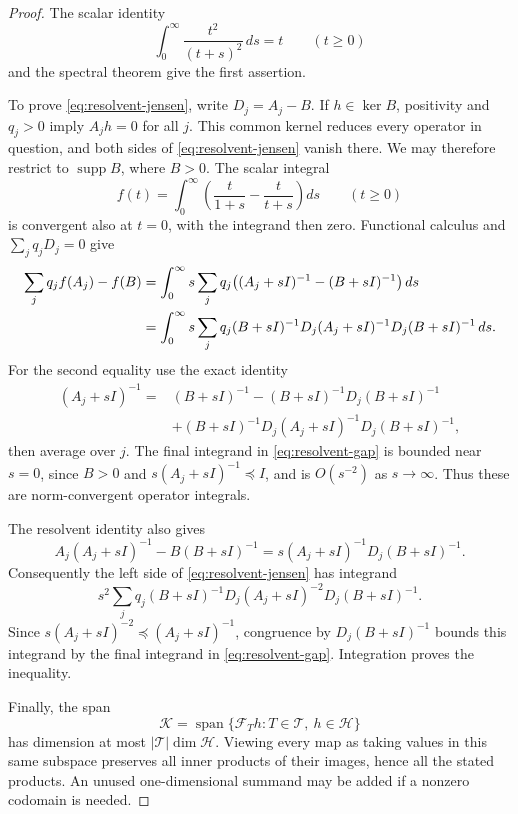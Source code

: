 \begin{proof}
The scalar identity
\[
 \int_0^\infty\frac{t^2}{(t+s)^2}\,ds=t\qquad(t\ge0)
\]
and the spectral theorem give the first assertion.

To prove \eqref{eq:resolvent-jensen}, write $D_j=A_j-B$.
If $h\in\ker B$, positivity and $q_j>0$ imply $A_jh=0$ for
all $j$.  This common kernel reduces every operator in question,
and both sides of \eqref{eq:resolvent-jensen} vanish there.
We may therefore restrict to $\operatorname{supp}B$, where $B>0$.
The scalar integral
\[
 f(t)=\int_0^\infty
       \left(\frac{t}{1+s}-\frac{t}{t+s}\right)ds
 \qquad(t\ge0)
\]
is convergent also at $t=0$, with the integrand then zero.  Functional
calculus and $\sum_jq_jD_j=0$ give
\begin{align}
 \sum_jq_j f(A_j)-f(B)
 &=\int_0^\infty s\sum_jq_j
       \big((A_j+sI)^{-1}-(B+sI)^{-1}\big)\,ds \notag\\
 &=\int_0^\infty s\sum_jq_j(B+sI)^{-1}D_j
       (A_j+sI)^{-1}D_j(B+sI)^{-1}\,ds.
 \label{eq:resolvent-gap}
\end{align}
For the second equality use the exact identity
\begin{align*}
 (A_j+sI)^{-1}
 ={}&(B+sI)^{-1}-(B+sI)^{-1}D_j(B+sI)^{-1}\\
 &+(B+sI)^{-1}D_j(A_j+sI)^{-1}D_j(B+sI)^{-1},
\end{align*}
then average over $j$.  The final integrand in
\eqref{eq:resolvent-gap} is bounded near $s=0$, since $B>0$ and
$s(A_j+sI)^{-1}\preceq I$, and is $O(s^{-2})$ as
$s\to\infty$.  Thus these are norm-convergent operator integrals.

The resolvent identity also gives
\[
 A_j(A_j+sI)^{-1}-B(B+sI)^{-1}
   =s(A_j+sI)^{-1}D_j(B+sI)^{-1}.
\]
Consequently the left side of \eqref{eq:resolvent-jensen} has integrand
\[
 s^2\sum_jq_j(B+sI)^{-1}D_j
       (A_j+sI)^{-2}D_j(B+sI)^{-1}.
\]
Since
$s(A_j+sI)^{-2}\preceq(A_j+sI)^{-1}$, congruence by
$D_j(B+sI)^{-1}$ bounds this integrand by the final integrand in
\eqref{eq:resolvent-gap}.  Integration proves the inequality.

Finally, the span
\[
 \mathcal K=\operatorname{span}\{\mathcal F_T h:
              T\in\mathscr T,\ h\in\mathcal H\}
\]
has dimension at most $|\mathscr T|\dim\mathcal H$.
Viewing every map as taking values in this same subspace preserves all
inner products of their images, hence all the stated products.
An unused one-dimensional summand may be added if a nonzero codomain
is needed.
\end{proof}

